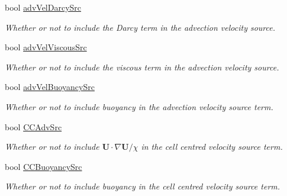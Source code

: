 \begin{DoxyCompactItemize}
\mbox{\label{struct_mushy_layer_options_a5b1392cf925b8f13261507d42ac4f970}} 
bool \hyperlink{struct_mushy_layer_options_a5b1392cf925b8f13261507d42ac4f970}{adv\+Vel\+Darcy\+Src}
\begin{DoxyCompactList}\small\item\em Whether or not to include the Darcy term in the advection velocity source. \end{DoxyCompactList}\item 
\mbox{\label{struct_mushy_layer_options_af9e18f4374942aa586eb2f6b99d441ab}} 
bool \hyperlink{struct_mushy_layer_options_af9e18f4374942aa586eb2f6b99d441ab}{adv\+Vel\+Viscous\+Src}
\begin{DoxyCompactList}\small\item\em Whether or not to include the viscous term in the advection velocity source. \end{DoxyCompactList}\item 
\mbox{\label{struct_mushy_layer_options_aab3695c6c01ec2b47d5536fd8fb97c65}} 
bool \hyperlink{struct_mushy_layer_options_aab3695c6c01ec2b47d5536fd8fb97c65}{adv\+Vel\+Buoyancy\+Src}
\begin{DoxyCompactList}\small\item\em Whether or not to include buoyancy in the advection velocity source term. \end{DoxyCompactList}\item 
\mbox{\label{struct_mushy_layer_options_afa118f040fb1b0d84cd5d6c4b8cc9edf}} 
bool \hyperlink{struct_mushy_layer_options_afa118f040fb1b0d84cd5d6c4b8cc9edf}{C\+C\+Adv\+Src}
\begin{DoxyCompactList}\small\item\em Whether or not to include $ \mathbf{U} \cdot \nabla \mathbf{U}/\chi $ in the cell centred velocity source term. \end{DoxyCompactList}\item 
\mbox{\label{struct_mushy_layer_options_af3d333fea72127f9cd6a2230c6a0af2f}} 
bool \hyperlink{struct_mushy_layer_options_af3d333fea72127f9cd6a2230c6a0af2f}{C\+C\+Buoyancy\+Src}
\begin{DoxyCompactList}\small\item\em Whether or not to include buoyancy in the cell centred velocity source term. \end{DoxyCompactList}\item 

\end{DoxyCompactItemize}
